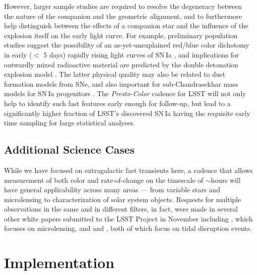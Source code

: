 \documentclass[letterpaper,longauthor,trackchanges,twocolumn,onecolappendix,sort&compress]{aastex62}
\begin{document}
However, larger sample studies are required to resolve the degeneracy between the nature of the companion and the geometric alignment, and to furthermore help distinguish between the effects of a companion star and the influence of the explosion itself on the early light curve. For example, preliminary population studies suggest the possibility of an as-yet-unexplained red/blue color dichotomy in early ($<$ 5 days) rapidly rising light curves of SN\,Ia \citep{Stritzinger2018}, and implications for outwardly mixed radioactive material are predicted by the double detonation explosion model \citep{Piro2016,Polin2018}. The latter physical quality may also be related to dust formation models from SNe, and also important for sub-Chandrasekhar mass models for SN\,Ia progenitors \citep{Polin2018}. The {\em Presto-Color} cadence for LSST will not only help to identify such fast features early enough for follow-up, but lead to a significantly higher fraction of LSST's discovered SN\,Ia having the requisite early time sampling for large statistical analyses.

\subsection{Additional Science Cases}\label{sec:additional}

While we have focused on extragalactic fast transients here, a cadence that allows measurement of both color and rate-of-change on the timescale of $\sim$hours will have general applicability across many areas --- from variable stars and microlensing to characterization of solar system objects. Requests for multiple observations in the same and in different filters, in fact, were made in several other white papers submitted to the LSST Project in November including \citet{streetWP}, which focuses on microlensing, and  \citet{Bricman2018} and \citet{Gezari2018}, both of which focus on tidal disruption events.



\section{Implementation}\label{sec:implementation}
\end{document}
